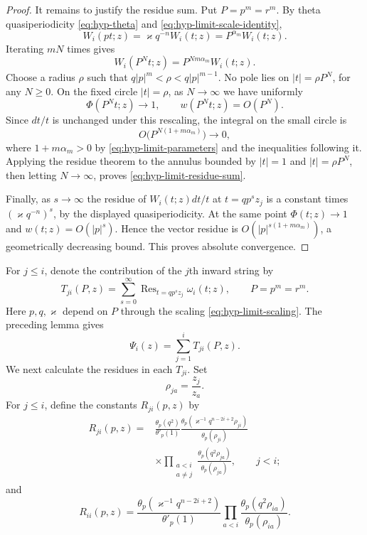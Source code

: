 \documentclass[12pt]{amsart}
\theoremstyle{definition}
\numberwithin{equation}{section}
\theoremstyle{definition}
\let\tht\theta
\let\om\omega
\let\ge\geqslant
\let\le\leqslant
\let\on\operatorname
\def\Res{\on{Res}}
\def\beq{\begin{equation}}
\def\eeq{\end{equation}}
\begin{document}
\begin{proof}
It remains to justify the residue sum. Put $P=p^m=r^m$.
By theta quasiperiodicity \eqref{eq:hyp-theta} and
\eqref{eq:hyp-limit-scale-identity},
\[
 W_i(pt;z)=\varkappa q^{-n}W_i(t;z)
              =P^{\alpha_m}W_i(t;z).
\]
Iterating $mN$ times gives
\[
 W_i(P^Nt;z)=P^{Nm\alpha_m}W_i(t;z).
\]
Choose a radius $\rho$ such that
$q|p|^m<\rho<q|p|^{m-1}$. No pole lies on
$|t|=\rho P^N$, for any $N\ge0$. On the fixed
circle $|t|=\rho$, as $N\to\infty$ we have uniformly
\[
 \Phi(P^Nt;z)\longrightarrow1,
 \qquad w(P^Nt;z)=O(P^N).
\]
Since $dt/t$ is unchanged under this rescaling, the
integral on the small circle is
\[
 O\bigl(P^{N(1+m\alpha_m)}\bigr)\longrightarrow0,
\]
where $1+m\alpha_m>0$ by \eqref{eq:hyp-limit-parameters}
and the inequalities following it. Applying the residue
theorem to the annulus bounded by $|t|=1$ and
$|t|=\rho P^N$, then letting $N\to\infty$, proves
\eqref{eq:hyp-limit-residue-sum}.

Finally, as $s\to\infty$ the residue of $W_i(t;z)dt/t$
at $t=qp^sz_j$ is a constant times
$(\varkappa q^{-n})^s$, by the displayed quasiperiodicity.
At the same point $\Phi(t;z)\to1$ and
$w(t;z)=O(|p|^s)$. Hence the vector residue is
$O(|p|^{s(1+m\alpha_m)})$, a geometrically decreasing
bound. This proves absolute convergence.
\end{proof}

For $j\le i$, denote the contribution of the $j$th inward
string by
\[
 T_{ji}(P,z)=\sum_{s=0}^{\infty}
       \Res_{t=qp^sz_j}\om_i(t;z),
 \qquad P=p^m=r^m.
\]
Here $p,q,\varkappa$ depend on $P$ through the scaling
\eqref{eq:hyp-limit-scaling}. The preceding lemma gives
\[
 \Psi_i(z)=\sum_{j=1}^i T_{ji}(P,z).
\]
We next calculate the residues in each $T_{ji}$. Set
\[
 \rho_{ja}=\frac{z_j}{z_a}.
\]
For $j\le i$, define the constants $R_{ji}(p,z)$ by
\beq\label{eq:hyp-limit-Roff}
 \begin{aligned}
 R_{ji}(p,z)={}&\frac{\tht_p(q^2)}{\tht'_p(1)}
 \frac{\tht_p(\varkappa^{-1}q^{n-2i+2}\rho_{ji})}
      {\tht_p(\rho_{ji})}\\
 &\times\prod_{\substack{a<i\\a\ne j}}
 \frac{\tht_p(q^2\rho_{ja})}{\tht_p(\rho_{ja})},
 \qquad j<i;
 \end{aligned}
\eeq
and
\beq\label{eq:hyp-limit-Rdiag}
 R_{ii}(p,z)=
 \frac{\tht_p(\varkappa^{-1}q^{n-2i+2})}
      {\tht'_p(1)}
 \prod_{a<i}\frac{\tht_p(q^2\rho_{ia})}
                    {\tht_p(\rho_{ia})}.
\eeq
\end{document}
